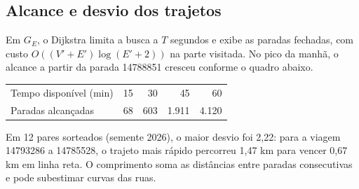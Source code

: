\subsection{Alcance e desvio dos trajetos}\label{sec:F-EFI-2}
Em $G_E$, o Dijkstra limita a busca a $T$ segundos e exibe as paradas
fechadas, com custo $O((V'+E')\log(E'+2))$ na parte visitada. No pico da
manhã, o alcance a partir da parada 14788851 cresceu conforme o quadro abaixo.
\begin{center}\small
\begin{tabular}{lrrrr}
Tempo disponível (min) & 15 & 30 & 45 & 60\\
Paradas alcançadas & 68 & 603 & 1.911 & 4.120
\end{tabular}
\end{center}
Em 12 pares sorteados (semente 2026), o maior desvio foi 2,22: para a viagem
14793286 a 14785528, o trajeto mais rápido percorreu 1,47 km para vencer
0,67 km em linha reta. O comprimento soma as distâncias entre paradas
consecutivas e pode subestimar curvas das ruas.
